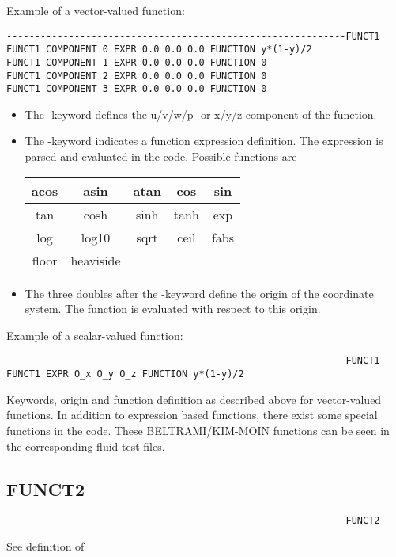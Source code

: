 Example of a vector-valued function:

\begin{verbatim}
------------------------------------------------------------FUNCT1
FUNCT1 COMPONENT 0 EXPR 0.0 0.0 0.0 FUNCTION y*(1-y)/2
FUNCT1 COMPONENT 1 EXPR 0.0 0.0 0.0 FUNCTION 0 
FUNCT1 COMPONENT 2 EXPR 0.0 0.0 0.0 FUNCTION 0
FUNCT1 COMPONENT 3 EXPR 0.0 0.0 0.0 FUNCTION 0
\end{verbatim}

\begin{itemize}
\item The -keyword defines the u/v/w/p- or x/y/z-component 
of the function.
\item The -keyword indicates a function expression definition.
The expression is parsed and evaluated in the code. Possible functions
are 

\begin{center}
\begin{tabular}{|c|c|c|c|c|}\hline
acos & asin      & atan & cos  & sin  \\\hline
tan  & cosh      & sinh & tanh & exp  \\\hline
log  & log10     & sqrt & ceil & fabs \\\hline
floor& heaviside &      &      &      \\\hline
\end{tabular}
\end{center}
\item The three doubles after the -keyword define the origin of
the coordinate system. The function is evaluated with respect to this origin.
\end{itemize}

Example of a scalar-valued function:

\begin{verbatim}
------------------------------------------------------------FUNCT1
FUNCT1 EXPR O_x O_y O_z FUNCTION y*(1-y)/2
\end{verbatim}

Keywords, origin and function definition as described above for vector-valued
functions. In addition to expression based functions, there exist some special
functions in the code. These BELTRAMI/KIM-MOIN functions can be seen in the
corresponding fluid test files.

\subsection{FUNCT2}
\begin{verbatim}
------------------------------------------------------------FUNCT2
\end{verbatim}
See definition of 

